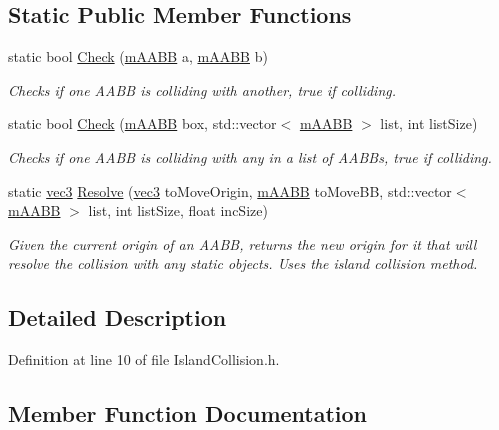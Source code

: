 \subsection*{Static Public Member Functions}
\begin{DoxyCompactItemize}
\item 
static bool \hyperlink{class_island_collision_a78e4fc740b5676ec2470fb3bd06e7fb7}{Check} (\hyperlink{structm_a_a_b_b}{m\+A\+A\+BB} a, \hyperlink{structm_a_a_b_b}{m\+A\+A\+BB} b)
\begin{DoxyCompactList}\small\item\em Checks if one A\+A\+BB is colliding with another, true if colliding. \end{DoxyCompactList}\item 
static bool \hyperlink{class_island_collision_a47b13bd9de6d0f242abf93c3345dec09}{Check} (\hyperlink{structm_a_a_b_b}{m\+A\+A\+BB} box, std\+::vector$<$ \hyperlink{structm_a_a_b_b}{m\+A\+A\+BB} $>$ list, int list\+Size)
\begin{DoxyCompactList}\small\item\em Checks if one A\+A\+BB is colliding with any in a list of A\+A\+B\+Bs, true if colliding. \end{DoxyCompactList}\item 
static \hyperlink{_types_8h_a3d0ce73e3199de81565fb01632415288}{vec3} \hyperlink{class_island_collision_a13a92119f2cca425c2bc886c0fc7ca75}{Resolve} (\hyperlink{_types_8h_a3d0ce73e3199de81565fb01632415288}{vec3} to\+Move\+Origin, \hyperlink{structm_a_a_b_b}{m\+A\+A\+BB} to\+Move\+BB, std\+::vector$<$ \hyperlink{structm_a_a_b_b}{m\+A\+A\+BB} $>$ list, int list\+Size, float inc\+Size)
\begin{DoxyCompactList}\small\item\em Given the current origin of an A\+A\+BB, returns the new origin for it that will resolve the collision with any static objects. Uses the island collision method. \end{DoxyCompactList}\end{DoxyCompactItemize}


\subsection{Detailed Description}


Definition at line 10 of file Island\+Collision.\+h.



\subsection{Member Function Documentation}
